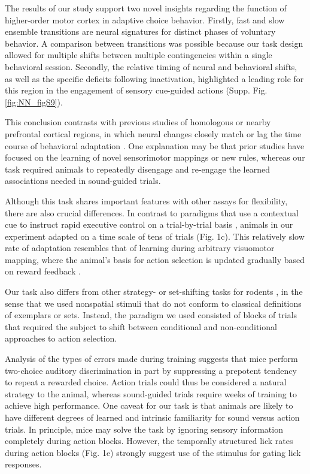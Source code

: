 
The results of our study support two novel insights regarding the function of higher-order motor cortex in adaptive choice behavior. Firstly, fast and slow ensemble transitions are neural signatures for distinct phases of voluntary behavior. A comparison between transitions was possible because our task design allowed for multiple shifts between multiple contingencies within a single behavioral session. Secondly, the relative timing of neural and behavioral shifts, as well as the specific deficits following inactivation, highlighted a leading role for this region in the engagement of sensory cue-guided actions (Supp. Fig. \ref{fig:NN_figS9}). 

This conclusion contrasts with previous studies of homologous or nearby prefrontal cortical regions, in which neural changes closely match or lag the time course of behavioral adaptation \citep{mitz1991learning,pasupathy2005different,durstewitz2010abrupt}. One explanation may be that prior studies have focused on the learning of novel sensorimotor mappings or new rules, whereas our task required animals to repeatedly disengage and re-engage the learned associations needed in sound-guided trials. 

Although this task shares important features with other assays for flexibility, there are also crucial differences. In contrast to paradigms that use a contextual cue to instruct rapid executive control on a trial-by-trial basis \citep{mante2013context,stokes2013dynamic,duan2015requirement}, animals in our experiment adapted on a time scale of tens of trials (Fig. 1c). This relatively slow rate of adaptation resembles that of learning during arbitrary visuomotor mapping, where the animal's basis for action selection is updated gradually based on reward feedback \citep{pasupathy2005different,asaad1998neural}. 

Our task also differs from other strategy- or set-shifting tasks for rodents \citep{durstewitz2010abrupt,darrah2008interaction}, in the sense that we used nonspatial stimuli that do not conform to classical definitions of exemplars or sets. Instead, the paradigm we used consisted of blocks of trials that required the subject to shift between conditional and non-conditional approaches to action selection. 

Analysis of the types of errors made during training suggests that mice perform two-choice auditory discrimination in part by suppressing a prepotent tendency to repeat a rewarded choice. Action trials could thus be considered a natural strategy to the animal, whereas sound-guided trials require weeks of training to achieve high performance. One caveat for our task is that animals are likely to have different degrees of learned and intrinsic familiarity for sound versus action trials. In principle, mice may solve the task by ignoring sensory information completely during action blocks. However, the temporally structured lick rates during action blocks (Fig. 1e) strongly suggest use of the stimulus for gating lick responses. 


